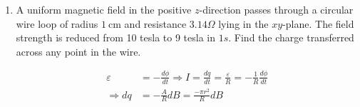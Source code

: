 \begin{enumerate}
\begin{answer}
\begin{align*}
\begin{array}{ccc}
	\hat{x} & \hat{y} & \hat{z} \\
	\partial / \partial x & \partial / \partial y & \partial / \partial z \\
	x & y & -z
	\end{array}\right|&=\hat{x}\left(-\frac{\partial z}{\partial y}-\frac{\partial y}{\partial z}\right)+\hat{y}\left(\frac{\partial x}{\partial z}+\frac{\partial z}{\partial x}\right)+\hat{z}\left(\frac{\partial y}{\partial x}-\frac{\partial x}{\partial y}\right)=0\\
	\text { (c) } \vec{\nabla} \times \vec{E}=K\left|\begin{array}{ccc}
	\hat{x} & \hat{y} & \hat{z} \\
	\partial / \partial x & \partial / \partial y & \partial / \partial z \\
	x & -y & 0
	\end{array}\right|&=\hat{x}\left(0+\frac{\partial y}{\partial z}\right)+\hat{y}\left(\frac{\partial x}{\partial z}-0\right)+\hat{z}\left(-\frac{\partial y}{\partial x}-\frac{\partial x}{\partial y}\right)=0\\
	\text { (d) } \vec{\nabla} \times \vec{E}=K\left|\begin{array}{ccc}
	\hat{x} & \hat{y} & \hat{z} \\
	\partial / \partial x & \partial / \partial y & \partial / \partial z \\
	y & -x & 2 z
	\end{array}\right|&=\hat{x}\left(\frac{\partial(2 z)}{\partial y}+\frac{\partial x}{\partial z}\right)+\hat{y}\left(-\frac{\partial x}{\partial z}-\frac{\partial(2 z)}{\partial x}\right)+\hat{z}\left(\frac{\partial y}{\partial x}-\frac{\partial y}{\partial y}\right)\\
	\Rightarrow \vec{\nabla} \times \vec{E}&=-\hat{z} \neq 0
	\end{align*}
\end{answer}
	\item A uniform magnetic field in the positive $z$-direction passes through a circular wire loop of radius $1 \mathrm{~cm}$ and resistance $3.14 \Omega$ lying in the $x y$-plane. The field strength is reduced from 10 tesla to 9 tesla in $1 s$. Find the charge transferred across any point in the wire. 
	\begin{answer}
		\begin{align*}
		\varepsilon&=-\frac{d \phi}{d t} \Rightarrow I=\frac{d q}{d t}=\frac{\varepsilon}{R}=-\frac{1}{R} \frac{d \phi}{d t}\\
		\Rightarrow d q&=-\frac{A}{R} d B=\frac{-\pi r^{2}}{R} d B\\

\end{align*}
\end{answer}
\end{enumerate}
